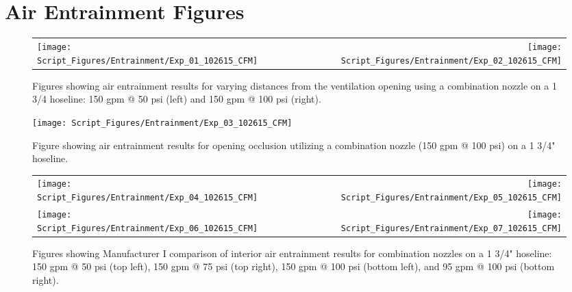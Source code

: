 \documentclass[12pt,oneside]{book}
\begin{document}


\clearpage

\appendix

\chapter{Air Entrainment Figures}
\label{app:Air_Entrainment_Figures}

\begin{figure}[!ht]
\begin{tabular*}{\textwidth}{lr}
\texttt{[image: Script\_Figures/Entrainment/Exp\_01\_102615\_CFM]} &
\texttt{[image: Script\_Figures/Entrainment/Exp\_02\_102615\_CFM]} \\
\end{tabular*}
\caption{Figures showing air entrainment results for varying distances from the ventilation opening using a combination nozzle on a 1 3/4 hoseline: 150 gpm @ 50 psi (left) and 150 gpm @ 100 psi (right).}
\label{fig:Distance_Tests}
\end{figure}

\begin{figure}[!ht]
\centering
\texttt{[image: Script\_Figures/Entrainment/Exp\_03\_102615\_CFM]}
\caption{Figure showing air entrainment results for opening occlusion utilizing a combination nozzle (150 gpm @ 100 psi) on a 1 3/4" hoseline.}
\label{fig:Opening_Occlusion}
\end{figure}

\clearpage

\begin{figure}[!ht]
\begin{tabular*}{\textwidth}{lr}
\texttt{[image: Script\_Figures/Entrainment/Exp\_04\_102615\_CFM]} &
\texttt{[image: Script\_Figures/Entrainment/Exp\_05\_102615\_CFM]} \\
\texttt{[image: Script\_Figures/Entrainment/Exp\_06\_102615\_CFM]} &
\texttt{[image: Script\_Figures/Entrainment/Exp\_07\_102615\_CFM]} \\
\end{tabular*}
\caption{Figures showing Manufacturer I comparison of interior air entrainment results for combination nozzles on a 1 3/4" hoseline: 150 gpm @ 50 psi (top left), 150 gpm @ 75 psi (top right), 150 gpm @ 100 psi (bottom left), and 95 gpm @ 100 psi (bottom right).}
\label{fig:1_5_Interior_Combination_Manufacturer_I}
\end{figure}

\clearpage
\end{document}
